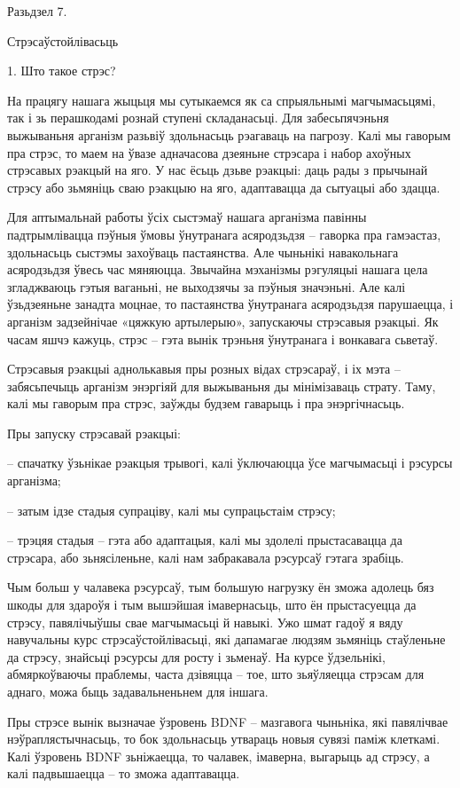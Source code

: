 Разьдзел 7. 

Стрэсаўстойлівасьць


1. Што такое стрэс?

На працягу нашага жыцьця мы сутыкаемся як са спрыяльнымі магчымасьцямі, так і зь перашкодамі рознай ступені складанасьці. Для забесьпячэньня выжываньня арганізм разьвіў здольнасьць рэагаваць на пагрозу. Калі мы гаворым пра стрэс, то маем на ўвазе адначасова дзеяньне стрэсара і набор ахоўных стрэсавых рэакцый на яго. У нас ёсьць дзьве рэакцыі: даць рады з прычынай стрэсу або зьмяніць сваю рэакцыю на яго, адаптавацца да сытуацыі або здацца.

Для аптымальнай работы ўсіх сыстэмаў нашага арганізма павінны падтрымлівацца пэўныя ўмовы ўнутранага асяродзьдзя – гаворка пра гамэастаз, здольнасьць сыстэмы захоўваць пастаянства. Але чыньнікі навакольнага асяродзьдзя ўвесь час мяняюцца. Звычайна мэханізмы рэгуляцыі нашага цела згладжваюць гэтыя ваганьні, не выходзячы за пэўныя значэньні. Але калі ўзьдзеяньне занадта моцнае, то пастаянства ўнутранага асяродзьдзя парушаецца, і арганізм задзейнічае «цяжкую артылерыю», запускаючы стрэсавыя рэакцыі. Як часам яшчэ кажуць, стрэс – гэта вынік трэньня ўнутранага і вонкавага сьветаў.

Стрэсавыя рэакцыі аднолькавыя пры розных відах стрэсараў, і іх мэта – забясьпечыць арганізм энэргіяй для выжываньня ды мінімізаваць страту. Таму, калі мы гаворым пра стрэс, заўжды будзем гаварыць і пра энэргічнасьць.

Пры запуску стрэсавай рэакцыі: 

– спачатку ўзьнікае рэакцыя трывогі, калі ўключаюцца ўсе магчымасьці і рэсурсы арганізма;

– затым ідзе стадыя супраціву, калі мы супрацьстаім стрэсу;

– трэцяя стадыя – гэта або адаптацыя, калі мы здолелі прыстасавацца да стрэсара, або зьнясіленьне, калі нам забракавала рэсурсаў гэтага зрабіць.

Чым больш у чалавека рэсурсаў, тым большую нагрузку ён зможа адолець бяз шкоды для здароўя і тым вышэйшая імавернасьць, што ён прыстасуецца да стрэсу, павялічыўшы свае магчымасьці й навыкі. Ужо шмат гадоў я вяду навучальны курс стрэсаўстойлівасьці, які дапамагае людзям зьмяніць стаўленьне да стрэсу, знайсьці рэсурсы для росту і зьменаў. На курсе ўдзельнікі, абмяркоўваючы праблемы, часта дзівяцца – тое, што зьяўляецца стрэсам для аднаго, можа быць задавальненьнем для іншага.

Пры стрэсе вынік вызначае ўзровень BDNF – мазгавога чыньніка, які павялічвае нэўраплястычнасьць, то бок здольнасьць утвараць новыя сувязі паміж клеткамі. Калі ўзровень BDNF зьніжаецца, то чалавек, імаверна, выгарыць ад стрэсу, а калі падвышаецца – то зможа адаптавацца.

